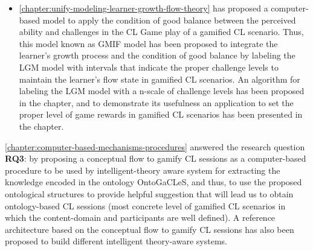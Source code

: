 \begin{itemize}
\item
\autoref{chapter:unify-modeling-learner-growth-flow-theory} has proposed a computer-based model to apply the condition of good balance between the perceived ability and challenges in the CL Game play of a gamified CL scenario. Thus, this model known as GMIF model has been proposed to integrate the learner's growth process and the condition of good balance by labeling the LGM model with intervals that indicate the proper challenge levels to maintain the learner's flow state in gamified CL scenarios. An algorithm for labeling the LGM model with a n-scale of challenge levels has been proposed in the chapter, and to demonstrate its usefulness an application to set the proper level of game rewards in gamified CL scenarios has been presented in the chapter.
\end{itemize}


\autoref{chapter:computer-based-mechanisms-procedures} answered the research question \textbf{RQ3}:  by proposing a conceptual flow to gamify CL sessions as a computer-based procedure to be used by intelligent-theory aware system for extracting the knowledge encoded in the ontology OntoGaCLeS, and thus, to use the proposed ontological structures to provide helpful suggestion that will lead us to obtain ontology-based CL sessions (most concrete level of gamified CL scenarios in which the content-domain and participants are well defined). A reference architecture based on the conceptual flow to gamify CL sessions has also been proposed to build different intelligent theory-aware systems.


